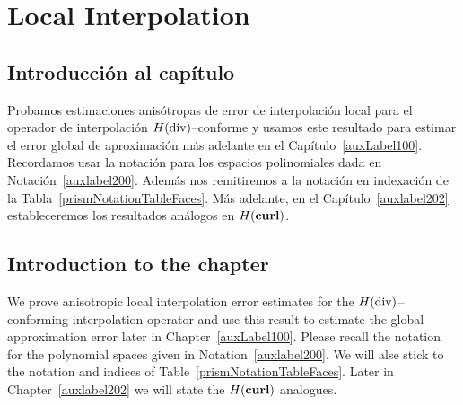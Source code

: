 \chapter{Local Interpolation}
\section*{Introducci\'on al cap\'itulo}
Probamos estimaciones anis\'otropas de error de interpolaci\'on local
para el operador de interpolaci\'on
$H(\operatorname{\textrm{div}})$--conforme
y usamos este resultado para estimar el error global de aproximaci\'on
m\'as adelante en el Cap\'itulo~\ref{auxLabel100}. 
Recordamos usar la notaci\'on para los espacios polinomiales
dada en Notaci\'on~\ref{auxlabel200}. Adem\'as nos remitiremos a la
notaci\'on en indexaci\'on de la Tabla~\ref{prismNotationTableFaces}.
M\'as adelante, en el Cap\'itulo~\ref{auxlabel202} 
estableceremos los resultados an\'alogos en $H(\textbf{curl})$.
\section*{Introduction to the chapter}
We prove anisotropic local interpolation error estimates
for the $H(\operatorname{\textrm{div}})$--conforming interpolation
operator
and use this result to estimate the global approximation error later
in Chapter~\ref{auxLabel100}. 
Please recall 
the notation for the polynomial spaces given in Notation~\ref{auxlabel200}. We 
will alse stick to the notation and indices of Table~\ref{prismNotationTableFaces}.
Later in Chapter~\ref{auxlabel202} we will state the $H(\textbf{curl})$ analogues.




